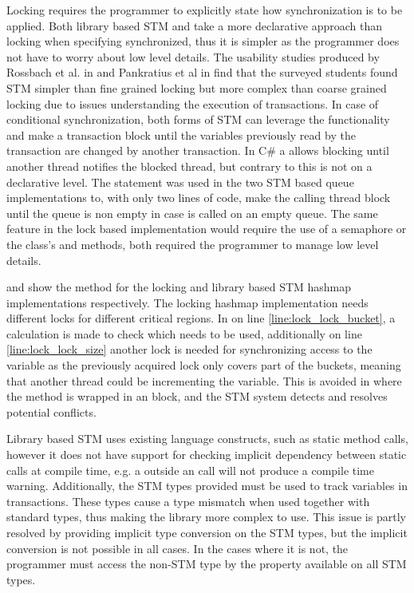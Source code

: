 Locking requires the programmer to explicitly state how synchronization is to be applied. Both library based \ac{STM} and \stmname take a more declarative approach than locking when specifying synchronized, thus it is simpler as the programmer does not have to worry about low level details. The usability studies produced by Rossbach et al. in \cite{rossbach2010transactional} and Pankratius et al in \cite{pankratius2009does} find that the surveyed students found \ac{STM} simpler than fine grained locking but more complex than coarse grained locking due to issues understanding the execution of transactions. In case of conditional synchronization, both forms of \ac{STM} can leverage the  functionality and make a transaction block until the variables previously read by the transaction are changed by another transaction. In C\# a  allows blocking until another thread notifies the blocked thread, but contrary to  this is not on a declarative level. The  statement was used in the two \ac{STM} based queue implementations to, with only two lines of code, make the calling thread block until the queue is non empty in case  is called on an empty queue. The same feature in the lock based implementation would require the use of a semaphore or the  class's  and  methods, both required the programmer to manage low level details. 

 and  show the  method for the locking and library based \ac{STM} hashmap implementations respectively. The locking hashmap implementation needs different locks for different critical regions. In  on line \ref{line:lock_lock_bucket}, a calculation is made to check which needs to be used, additionally on line \ref{line:lock_lock_size} another lock is needed for synchronizing access to the  variable as the previously acquired lock only covers part of the buckets, meaning that another thread could be incrementing the  variable. This is avoided in  where the method is wrapped in an  block, and the \ac{STM} system detects and resolves potential conflicts.

Library based \ac{STM} uses existing language constructs, such as static method calls, however it does not have support for checking implicit dependency between static calls at compile time, e.g. a  outside an  call will not produce a compile time warning. Additionally, the \ac{STM} types provided must be used to track variables in transactions. These types cause a type mismatch when used together with standard types, thus making the library more complex to use. This issue is partly resolved by providing implicit type conversion on the \ac{STM} types, but the implicit conversion is not possible in all cases. In the cases where it is not, the programmer must access the non-\ac{STM} type by the  property available on all \ac{STM} types. 

